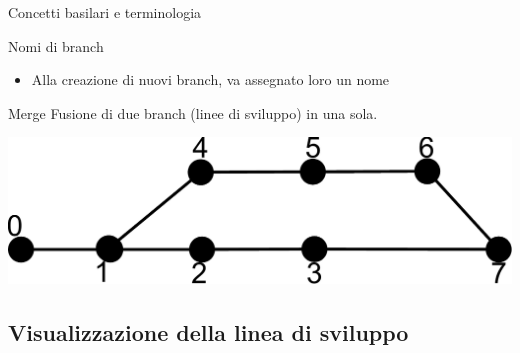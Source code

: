 \documentclass[xcolor=dvipsnames,presentation]{beamer}
\begin{document}
\begin{frame}[allowframebreaks]{Concetti basilari e terminologia}
\begin{block}{Nomi di branch}
\begin{itemize}
\begin{itemize}
                \begin{itemize}
                    \item \url{https://sfconservancy.org/news/2020/jun/23/gitbranchname/}
                \end{itemize}
                \item Versioni recenti di git consigliano la configurazione del default branch name con un warning al primo \texttt{init}
                \item Il nome di default è settabile con
                \begin{itemize}
                    \item \texttt{git config --global init.defaultBranch <BRANCH-NAME>}
                \end{itemize}
            \end{itemize}
            \item Alla creazione di nuovi branch, va assegnato loro un nome
        \end{itemize}
    \end{block}
    \begin{block}{Merge}
        Fusione di due branch (linee di sviluppo) in una sola.
        \begin{center}
            \includegraphics[width=.99\textwidth]{img/merge}
        \end{center}
    \end{block}
\end{frame}

\subsection{Visualizzazione della linea di sviluppo}
\end{document}

